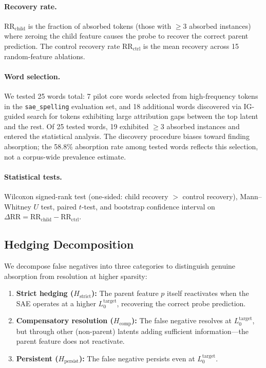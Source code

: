 \documentclass{article}
\begin{document}
\paragraph{Recovery rate.} $\text{RR}_{\text{child}}$ is the fraction of absorbed tokens (those with $\geq 3$ absorbed instances) where zeroing the child feature causes the probe to recover the correct parent prediction. The control recovery rate $\text{RR}_{\text{ctrl}}$ is the mean recovery across 15 random-feature ablations.

\paragraph{Word selection.} We tested 25 words total: 7 pilot core words selected from high-frequency tokens in the \texttt{sae\_spelling} evaluation set, and 18 additional words discovered via IG-guided search for tokens exhibiting large attribution gaps between the top latent and the rest. Of 25 tested words, 19 exhibited $\geq 3$ absorbed instances and entered the statistical analysis. The discovery procedure biases toward finding absorption; the 58.8\% absorption rate among tested words reflects this selection, not a corpus-wide prevalence estimate.

\paragraph{Statistical tests.} Wilcoxon signed-rank test (one-sided: child recovery $>$ control recovery), Mann--Whitney $U$ test, paired $t$-test, and bootstrap confidence interval on $\Delta\text{RR} = \text{RR}_{\text{child}} - \text{RR}_{\text{ctrl}}$.

\subsection{Hedging Decomposition}
\label{sec:hedging_method}

We decompose false negatives into three categories to distinguish genuine absorption from resolution at higher sparsity:

\begin{enumerate}
\item \textbf{Strict hedging ($H_{\text{strict}}$):} The parent feature $p$ itself reactivates when the SAE operates at a higher $L_0^{\text{target}}$, recovering the correct probe prediction.
\item \textbf{Compensatory resolution ($H_{\text{comp}}$):} The false negative resolves at $L_0^{\text{target}}$, but through other (non-parent) latents adding sufficient information---the parent feature does not reactivate.
\item \textbf{Persistent ($H_{\text{persist}}$):} The false negative persists even at $L_0^{\text{target}}$.
\end{enumerate}
\end{document}

